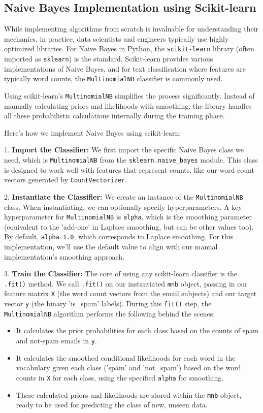 \documentclass[12pt,a4paper]{article}
\begin{document}
\subsection{Naive Bayes Implementation using Scikit-learn}

While implementing algorithms from scratch is invaluable for understanding their mechanics, in practice, data scientists and engineers typically use highly optimized libraries. For Naive Bayes in Python, the \texttt{scikit-learn} library (often imported as \texttt{sklearn}) is the standard. Scikit-learn provides various implementations of Naive Bayes, and for text classification where features are typically word counts, the \texttt{MultinomialNB} classifier is commonly used.

Using scikit-learn's \texttt{MultinomialNB} simplifies the process significantly. Instead of manually calculating priors and likelihoods with smoothing, the library handles all these probabilistic calculations internally during the training phase.

Here's how we implement Naive Bayes using scikit-learn:

1.  \textbf{Import the Classifier:} We first import the specific Naive Bayes class we need, which is \texttt{MultinomialNB} from the \texttt{sklearn.naive\_bayes} module. This class is designed to work well with features that represent counts, like our word count vectors generated by \texttt{CountVectorizer}.

2.  \textbf{Instantiate the Classifier:} We create an instance of the \texttt{MultinomialNB} class. When instantiating, we can optionally specify hyperparameters. A key hyperparameter for \texttt{MultinomialNB} is \texttt{alpha}, which is the smoothing parameter (equivalent to the 'add-one' in Laplace smoothing, but can be other values too). By default, \texttt{alpha=1.0}, which corresponds to Laplace smoothing. For this implementation, we'll use the default value to align with our manual implementation's smoothing approach.

3.  \textbf{Train the Classifier:} The core of using any scikit-learn classifier is the \texttt{.fit()} method. We call \texttt{.fit()} on our instantiated \texttt{mnb} object, passing in our feature matrix \texttt{X} (the word count vectors from the email subjects) and our target vector \texttt{y} (the binary 'is\_spam' labels). During this \texttt{fit()} step, the \texttt{MultinomialNB} algorithm performs the following behind the scenes:
\begin{itemize}
    \item It calculates the prior probabilities for each class based on the counts of spam and not-spam emails in \texttt{y}.
    \item It calculates the smoothed conditional likelihoods for each word in the vocabulary given each class ('spam' and 'not\_spam') based on the word counts in \texttt{X} for each class, using the specified \texttt{alpha} for smoothing.
    \item These calculated priors and likelihoods are stored within the \texttt{mnb} object, ready to be used for predicting the class of new, unseen data.
\end{itemize}
\end{document}

